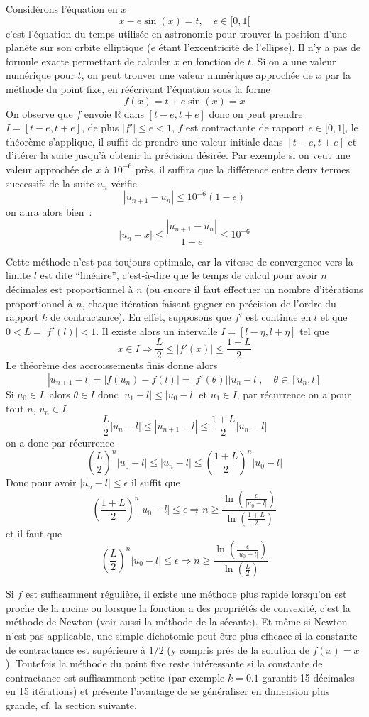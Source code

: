 \documentclass[a4paper,11pt]{article}
\newcommand{\R}{{\mathbb{R}}}
\begin{document}
Considérons l'équation en $x$
\[ x- e \sin(x) =t, \quad e \in [0,1[ \]
c'est l'équation du temps utilisée en astronomie pour trouver la
position d'une planète sur son orbite elliptique ($e$ étant l'excentricité
de l'ellipse).
Il n'y a pas de formule exacte permettant de calculer $x$ en fonction de $t$.
Si on a une valeur numérique pour $t$, on peut trouver une valeur
numérique approchée de $x$ par la méthode du point fixe, en réécrivant
l'équation sous la forme 
\[ f(x)=t+e\sin(x) = x \]
On observe que $f$ envoie $\R$ dans $[t-e,t+e]$ donc on peut prendre
$I=[t-e,t+e]$, de plus $|f'|\leq e <1$, $f$ est contractante
de rapport $e \in [0,1[$, le théorème s'applique, il suffit de
prendre une valeur initiale dans $[t-e,t+e]$ et d'itérer la suite
jusqu'à obtenir la précision désirée. Par exemple si on veut une
valeur approchée de $x$ à $10^{-6}$ près, il suffira que la différence
entre deux termes successifs de la suite $u_n$ vérifie
\[ |u_{n+1}-u_n| \leq  10^{-6} (1-e) \]
on aura alors bien~:
\[ |u_n-x| \leq \frac{|u_{n+1}-u_n|}{1-e} \leq 10^{-6} \]

Cette méthode n'est pas toujours optimale, car la vitesse de convergence
vers la limite $l$ est dite ``linéaire'', c'est-\`a-dire 
que le temps de calcul pour
avoir $n$ décimales est proportionnel à $n$ (ou
encore il faut effectuer un nombre d'itérations
proportionnel à $n$, chaque itération faisant
gagner en précision de l'ordre du rapport $k$ de contractance). 
En effet, supposons que $f'$ est continue en $l$ et que $0<L=|f'(l)|<1 $.
Il existe alors un intervalle $I=[l-\eta,l+\eta]$ tel que
\[  x \in I \Rightarrow \frac{L}{2} \leq |f'(x)| \leq \frac{1+L}{2} \]
Le th\'eor\`eme des accroissements finis donne alors
\[ |u_{n+1} - l | = |f(u_n)-f(l)| = |f'(\theta)| |u_n-l|,
\quad \theta \in [u_n,l] \]
Si $u_0 \in I$, alors $\theta \in I$ donc $|u_1-l| \leq |u_0-l|$ et
$u_1 \in I$, par r\'ecurrence on a pour tout $n$, $u_n \in I$ 
\[ \frac{L}{2} |u_n-l| \leq |u_{n+1} - l| \leq \frac{1+L}{2} |u_n-l| \]
on a donc par r\'ecurrence 
\[ \left(\frac{L}{2}\right)^n|u_0-l| \leq |u_n-l| \leq  
\left( \frac{1+L}{2} \right)^n|u_0-l|
\]
Donc pour avoir $|u_n-l| \leq \epsilon$ il suffit que 
\[ \left( \frac{1+L}{2} \right)^n|u_0-l| \leq \epsilon \Rightarrow
n \geq \frac{\ln(\frac{\epsilon}{|u_0-l|})}{\ln( \frac{1+L}{2}) } \]
et il faut que
\[ \left(\frac{L}{2}\right)^n |u_0-l| \leq \epsilon
\Rightarrow
n \geq \frac{\ln(\frac{\epsilon}{|u_0-l|})}{\ln( \frac{L}{2}) }
 \]

Si $f$ est suffisamment r\'eguli\`ere,
il existe une méthode plus rapide lorsqu'on est proche de la racine ou lorsque
la fonction a des propriétés de convexité, c'est la méthode de Newton
(voir aussi la m\'ethode de la s\'ecante).
Et m\^eme si Newton n'est pas applicable, une simple dichotomie
peut \^etre plus efficace si la constante de contractance est 
sup\'erieure \`a $1/2$ (y compris pr\'es de la solution de $f(x)=x$).
Toutefois la m\'ethode du point fixe reste int\'eressante si la
constante de contractance est suffisamment petite (par exemple $k=0.1$
garantit 15 d\'ecimales en 15 it\'erations) et pr\'esente l'avantage
de se g\'en\'eraliser en dimension plus grande, cf. la section suivante.
\end{document}
